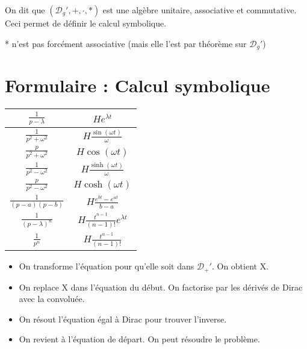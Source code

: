 \documentclass{article}
\begin{document}
On dit que $(\mathcal{D}_g ',+,\cdot,*)$ est une algèbre unitaire, associative et commutative. \\
Ceci permet de définir le calcul symbolique.

\begin{rmq}
* n'est pas forcément associative (mais elle l'est par théorème sur $\mathcal{D}_g '$)
\end{rmq}

\section{Formulaire : Calcul symbolique}
\begin{center}
\begin{tabular}{|c|c|}
\hline
$\frac{1}{p-\lambda}$ & $He^{\lambda t}$ \\
\hline
$\frac{1}{p^2+\omega^2}$ & $H\frac{\sin(\omega t)}{\omega}$ \\
\hline
$\frac{p}{p^2+\omega^2}$ & $H\cos(\omega t)$ \\
\hline
$\frac{1}{p^2-\omega^2}$ & $H \frac{\sinh(\omega t)}{\omega}$ \\
\hline
$\frac{p}{p^2-\omega^2}$ & $H \cosh(\omega t)$ \\
\hline
$\frac{1}{(p-a)(p-b)}$ & $H \frac{e^{bt} - e^{at}}{b-a}$ \\
\hline
$\frac{1}{(p-\lambda)^n}$ & $H \frac{t^{n-1}}{(n-1)!} e^{\lambda t}$ \\
\hline
$\frac{1}{p^n}$ & $H \frac{t^{n-1}}{(n-1)!}$  \\
\hline
\end{tabular}
\end{center}

\begin{itemize}
\item On transforme l'équation pour qu'elle soit dans $\mathcal{D}_+ '$. On obtient X.
\item On replace X dans l'équation du début. On factorise par les dérivés de Dirac avec la convoluée.
\item On résout l'équation égal à Dirac pour trouver l'inverse. 
\item On revient à l'équation de départ. On peut résoudre le problème.
\end{itemize}
\end{document}
